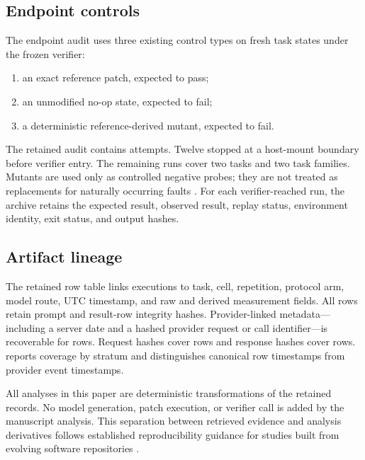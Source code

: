 \subsection{Endpoint controls}

The endpoint audit uses three existing control types on fresh task states under the frozen verifier:
\begin{enumerate}
    \item an exact reference patch, expected to pass;
    \item an unmodified no-op state, expected to fail;
    \item a deterministic reference-derived mutant, expected to fail.
\end{enumerate}
The retained audit contains \ControlAttempts{} attempts. Twelve stopped at a host-mount boundary before verifier entry. The remaining \VerifierReachedControls{} runs cover two tasks and two task families. Mutants are used only as controlled negative probes; they are not treated as replacements for naturally occurring faults \citep{just2014mutants}. For each verifier-reached run, the archive retains the expected result, observed result, replay status, environment identity, exit status, and output hashes.

\subsection{Artifact lineage}

The retained row table links executions to task, cell, repetition, protocol arm, model route, UTC timestamp, and raw and derived measurement fields. All \TotalRows{} rows retain prompt and result-row integrity hashes. Provider-linked metadata---including a server date and a hashed provider request or call identifier---is recoverable for \ProviderMapped{} rows. Request hashes cover \RequestHashed{} rows and response hashes cover \ResponseHashed{} rows.  reports coverage by stratum and distinguishes canonical row timestamps from provider event timestamps.

All analyses in this paper are deterministic transformations of the retained records. No model generation, patch execution, or verifier call is added by the manuscript analysis. This separation between retrieved evidence and analysis derivatives follows established reproducibility guidance for studies built from evolving software repositories \citep{gonzalez2012reproducibility}.
